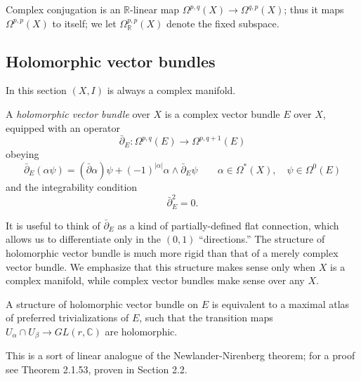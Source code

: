 \documentclass[12pt,letterpaper,reqno]{article}
\numberwithin{equation}{section}
\newcommand{\R}{\ensuremath{\mathbb R}}
\newcommand{\C}{\ensuremath{\mathbb C}}
\newcommand{\abs}[1]{\lvert#1\rvert}
\newcommand{\ti}[1]{\textit{#1}}
\begin{document}
Complex conjugation is an $\R$-linear map
$\Omega^{p,q}(X) \to \Omega^{q,p}(X)$;
thus it maps $\Omega^{p,p}(X)$ to itself;
we let $\Omega_\R^{p,p}(X)$ denote the fixed subspace.

\subsection{Holomorphic vector bundles}

In this section $(X,I)$ is always a complex manifold.

\begin{defn} A \ti{holomorphic vector bundle} over $X$ is a complex vector bundle $E$ over $X$, equipped with an operator
\begin{equation}
  \bar\partial_E :  \Omega^{p,q}(E) \to \Omega^{p,q+1}(E)
\end{equation}
obeying
\begin{equation}
  \bar\partial_E (\alpha \psi) = (\bar\partial \alpha) \psi + (-1)^{\abs{\alpha}} \alpha \wedge \bar\partial_E \psi \qquad \alpha \in \Omega^*(X), \quad \psi \in \Omega^0(E)
\end{equation}
and the integrability condition
\begin{equation}
  \bar\partial_E^2 = 0.
\end{equation}
\end{defn}

It is useful to think of $\bar\partial_E$ as a kind of 
partially-defined flat connection, which allows us to differentiate
only in the $(0,1)$ ``directions.''
The structure of holomorphic vector bundle is much 
more rigid than that of a merely complex vector bundle.
We emphasize that this structure makes sense only when $X$ is 
a complex manifold, while complex vector bundles make sense 
over any $X$.

\begin{prop} A structure of holomorphic vector bundle on $E$ is equivalent to a maximal atlas 
of preferred trivializations of $E$, such that
the transition maps 
$U_\alpha \cap U_\beta \to GL(r,\C)$ 
are holomorphic. 
\end{prop}
\begin{pf}
This is a sort of linear analogue of the 
Newlander-Nirenberg theorem; for a proof see 
\cite{MR1079726} Theorem 2.1.53, proven in Section 2.2.
\end{pf}

\end{document}
